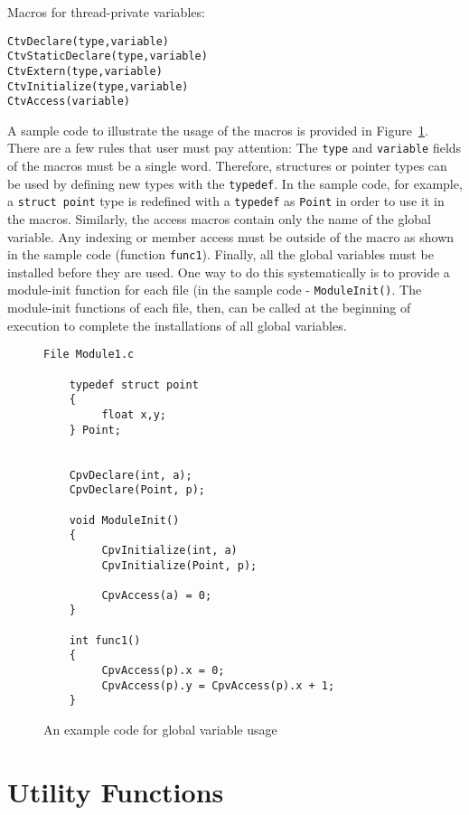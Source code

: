Macros for thread-private variables:
\begin{verbatim}
CtvDeclare(type,variable)
CtvStaticDeclare(type,variable)
CtvExtern(type,variable)
CtvInitialize(type,variable)
CtvAccess(variable)
\end{verbatim}


A sample code to illustrate the usage of the macros is provided
in Figure~\ref{fig:cpv}.
There are a few rules that user must pay attention: The
{\tt type} and {\tt variable} fields of the macros must be a single
word. Therefore, structures or pointer types can be used by defining
new types with the {\tt typedef}. In the sample code, for example,
a {\tt struct point} type is redefined with a {\tt typedef} as {\tt Point}
in order to use it in the macros. Similarly,  the access macros contain
only the name of the global variable. Any indexing or member access
must be outside of the macro as shown in the sample code 
(function {\tt func1}). Finally, all the global variables must be
installed before they are used. One way to do this systematically is
to provide a module-init function for each file (in the sample code - 
{\tt ModuleInit()}. The module-init functions of each file, then, can be 
called at the beginning of execution to complete the installations of 
all global variables.

\begin{figure}
\begin{verbatim}
File Module1.c

    typedef struct point
    {
         float x,y;
    } Point;


    CpvDeclare(int, a);
    CpvDeclare(Point, p);

    void ModuleInit()
    {
         CpvInitialize(int, a)
         CpvInitialize(Point, p);

         CpvAccess(a) = 0;
    }

    int func1() 
    {
         CpvAccess(p).x = 0;
         CpvAccess(p).y = CpvAccess(p).x + 1;
    }
\end{verbatim}
\caption{An example code for global variable usage}
\label{fig:cpv}
\end{figure}

\section{Utility Functions}
\label{utility}


